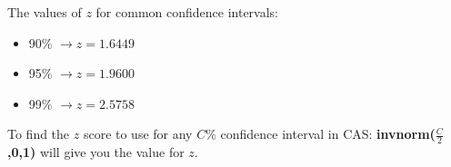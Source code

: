 \documentclass[a4paper,twoside,10pt]{article}
\begin{document}
				\begin{minipage}{0.5\textwidth}
					The values of $z$ for common confidence intervals:
					\begin{itemize}
						\item 90\% $\to z=1.6449$
						\item 95\% $\to z=1.9600$
						\item 99\% $\to z=2.5758$
					\end{itemize}
				\end{minipage}
				\hfill
				\begin{minipage}{0.5\textwidth}
					To find the $z$ score to use for any $C\%$ confidence interval in CAS: \textbf{invnorm($\frac{C}{2}$,0,1)} will give you the value for $z$.
				\end{minipage}
				
				
				
\end{document}
